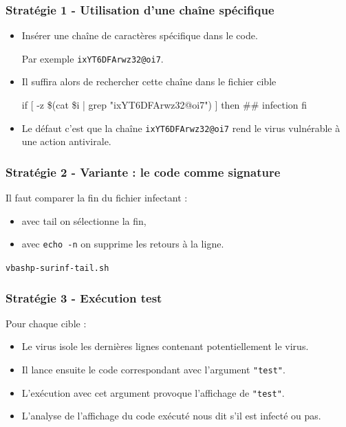 \documentclass{beamer}
\begin{document}
\begin{frame}[fragile]
\frametitle{Stratégie 1 - Utilisation d'une chaîne spécifique}

\begin{itemize}
\item Insérer une chaîne de caractères spécifique dans le code.


Par exemple {\color{blue} \texttt{ixYT6DFArwz32@oi7}. }


\item Il suffira alors de rechercher cette chaîne dans le fichier cible
\begin{semiverbatim}
if [ -z \$(cat \$i | grep "ixYT6DFArwz32@oi7") ]
then
     \#\# infection
fi
\end{semiverbatim}
\item Le défaut c'est que la chaîne \texttt{ixYT6DFArwz32@oi7} rend le virus vulnérable à une action antivirale.
\end{itemize}
\end{frame}





\begin{frame}[fragile]
  \frametitle{Stratégie 2 - Variante : le code comme signature}
  Il faut comparer la fin du fichier infectant :
  \begin{itemize}
  \item avec tail on sélectionne la fin,
    \item avec  \texttt{echo -n} on supprime les retours à la ligne.
  \end{itemize}

\begin{block}{\texttt{vbashp-surinf-tail.sh}}    \begin{small}
\end{small}\end{block}
\end{frame}

\begin{frame}
  \frametitle{Stratégie 3 - Exécution test}


Pour chaque cible :
\begin{itemize}
\item Le virus isole les dernières lignes contenant potentiellement le virus.
\item Il lance ensuite le code correspondant avec l'argument \texttt{"test"}.
\item L'exécution avec cet argument provoque l'affichage de \texttt{"test"}.
  \item L'analyse de l'affichage du code exécuté nous dit s'il est infecté ou pas.
\end{itemize}
\end{frame}
\end{document}
